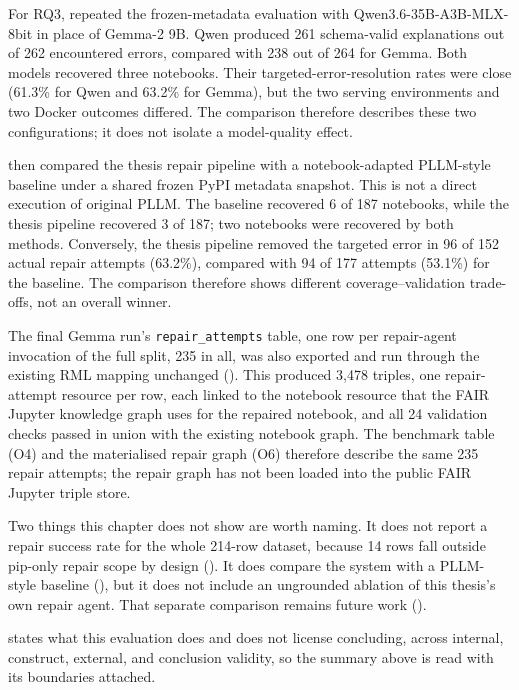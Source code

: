 For RQ3,  repeated the frozen-metadata
evaluation with Qwen3.6-35B-A3B-MLX-8bit in place of Gemma-2 9B. Qwen
produced 261 schema-valid explanations out of 262 encountered errors,
compared with 238 out of 264 for Gemma. Both models recovered three
notebooks. Their targeted-error-resolution rates were close (61.3\% for
Qwen and 63.2\% for Gemma), but the two serving environments and two Docker
outcomes differed. The comparison therefore describes these two
configurations; it does not isolate a model-quality effect.

 then compared the thesis repair pipeline with
a notebook-adapted PLLM-style baseline under a shared frozen PyPI metadata
snapshot. This is not a direct execution of original PLLM. The baseline
recovered 6 of 187 notebooks, while the thesis pipeline recovered 3 of 187;
two notebooks were recovered by both methods. Conversely, the thesis pipeline
removed the targeted error in 96 of 152 actual repair attempts (63.2\%),
compared with 94 of 177 attempts (53.1\%) for the baseline. The comparison
therefore shows different coverage--validation trade-offs, not an overall
winner.

The final Gemma run's \texttt{repair\_attempts} table, one row per
repair-agent invocation of the full split, 235 in all, was also exported
and run through the existing RML mapping unchanged
(). This produced 3{,}478 triples, one
repair-attempt resource per row, each linked to the notebook resource that
the FAIR Jupyter knowledge graph uses for the repaired notebook, and all
24 validation checks passed in union with the existing notebook graph.
The benchmark table (O4) and the materialised repair graph (O6) therefore
describe the same 235 repair attempts; the repair graph has not been
loaded into the public FAIR Jupyter triple store.

Two things this chapter does not show are worth naming. It does not report
a repair success rate for the whole 214-row dataset, because 14 rows fall
outside pip-only repair scope by design (). It
does compare the system with a PLLM-style baseline
(), but it does not include an ungrounded
ablation of this thesis's own repair agent. That separate comparison remains
future work ().

 states what this evaluation does and does not license
concluding, across internal, construct, external, and conclusion validity,
so the summary above is read with its boundaries attached.
\fi
